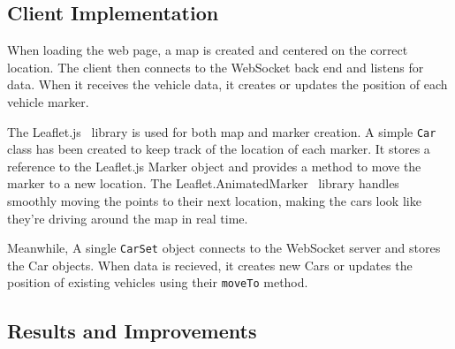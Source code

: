 \documentclass[ %
                    author={Alexander Hill},
                supervisor={Dr. Benjamin Sach},
                    degree={MEng},
                     title={MARMOSET},
                  subtitle={Multi-Agent Route Management using Online Simulation for Efficient Transportation},
                      type={research},
                      year={2016} ]{dissertation}
\begin{document}
\subsection{Client Implementation}

When loading the web page, a map is created and centered on the correct location.
The client then connects to the WebSocket back end and listens for data. When it
receives the vehicle data, it creates or updates the position of each vehicle marker.

The Leaflet.js~\cite{leaflet} library is used for both map and marker creation.
A simple \texttt{Car} class has been created to keep track of the location of each
marker. It stores a reference to the Leaflet.js Marker object and provides a method to
move the marker to a new location. The Leaflet.AnimatedMarker~\cite{animarker}
library handles smoothly moving the points to their next location, making the
cars look like they're driving around the map in real time.

Meanwhile, A single \texttt{CarSet} object connects to the WebSocket server and stores the
Car objects. When data is recieved, it creates new Cars or updates the
position of existing vehicles using their \texttt{moveTo} method.

\subsection{Results and Improvements}
\end{document}
